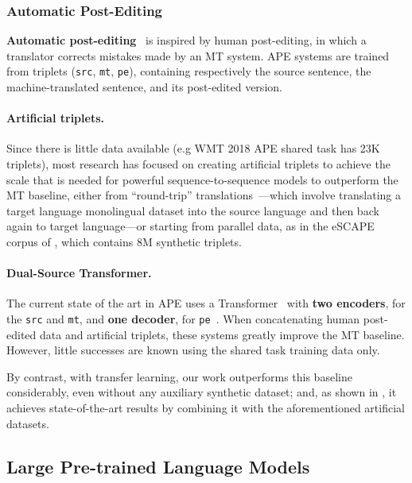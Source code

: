 \subsubsection{Automatic Post-Editing}
\label{sec:ape_bg}

{\bf Automatic post-editing}~\citep[APE;][]{simard2007rule} is
inspired by human post-editing, in which a translator corrects
mistakes made by an MT system. APE systems are trained from triplets
({\tt src}, {\tt mt}, {\tt pe}), containing respectively the source
sentence, the machine-translated sentence, and its post-edited
version.

\paragraph*{Artificial triplets.} Since there is little data
available (e.g WMT 2018 APE shared task has 23K triplets), most
research has focused on creating artificial triplets to achieve the
scale that is needed for powerful sequence-to-sequence models to
outperform the MT baseline, either from ``round-trip''
translations~\citep{junczys2016log}---which involve translating a
target language monolingual dataset into the source language and then
back again to target language---or starting from parallel data, as in
the eSCAPE corpus of \citet{negri2018escape}, which contains 8M
synthetic triplets.

\paragraph*{Dual-Source Transformer.} The current state of the art in
APE uses a Transformer~\citep{vaswani2017attention} with {\bf two
        encoders}, for the {\tt src} and {\tt mt}, and {\bf one decoder}, for
    {\tt pe}~\citep{junczys2018ms, tebbifakhr2018multi}. When
concatenating human post-edited data and artificial triplets, these
systems greatly improve the MT baseline. However, little successes
are known using the shared task training data only.

By contrast, with transfer learning, our work outperforms this
baseline considerably, even without any auxiliary synthetic dataset;
and, as shown in , it achieves
state-of-the-art results by combining it with the aforementioned
artificial datasets.

\subsection{Large Pre-trained Language Models}
